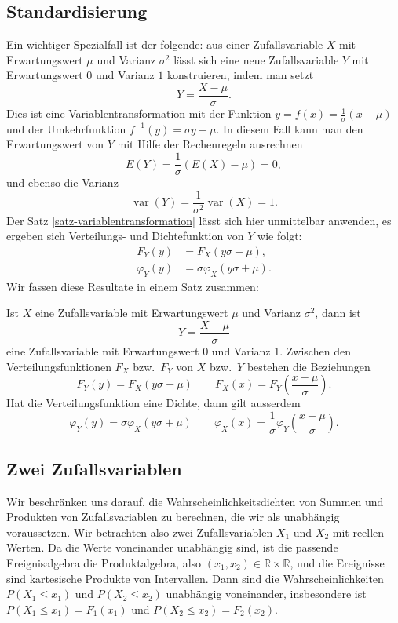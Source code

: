 \subsection{Standardisierung} \label{section-standardisierung}
Ein wichtiger Spezialfall ist der folgende:
aus einer Zufallsvariable $X$ mit Erwartungswert
$\mu$ und Varianz $\sigma^2$ lässt sich eine neue Zufallsvariable $Y$ mit
Erwartungswert $0$ und Varianz $1$ konstruieren, indem man setzt
\[
Y=\frac{X-\mu}{\sigma}.
\]
Dies ist eine Variablentransformation mit der Funktion
$y=f(x)=\frac1\sigma(x-\mu)$ und der Umkehrfunktion $f^{-1}(y)=\sigma y+\mu$.
In diesem Fall kann man den Erwartungswert von $Y$ mit Hilfe der Rechenregeln
ausrechnen
\[
E(Y)=\frac1{\sigma}(E(X)-\mu)=0,
\]
und ebenso die Varianz
\[
\operatorname{var}(Y)=\frac1{\sigma^2}\operatorname{var}(X)=1.
\]
Der Satz \ref{satz-variablentransformation} lässt sich hier unmittelbar
anwenden, es ergeben sich Verteilungs- und Dichtefunktion von $Y$
wie folgt:
\begin{align*}
F_Y(y)&=F_X(y\sigma+\mu),\\
\varphi_Y(y)&=\sigma\varphi_X(y\sigma+\mu).
\end{align*}
Wir fassen diese Resultate in einem Satz zusammen:

\begin{satz}
\label{satz-standardisierung}
Ist $X$ eine Zufallsvariable mit Erwartungswert $\mu$ und
Varianz $\sigma^2$, dann ist
\[
Y=\frac{X-\mu}\sigma
\]
eine Zufallsvariable mit Erwartungswert 0 und Varianz 1.
Zwischen den Verteilungsfunktionen $F_X$ bzw.~$F_Y$ von $X$ bzw.~$Y$ 
bestehen die Beziehungen
\[
F_Y(y)=F_X(y\sigma+\mu)\qquad F_X(x)=F_Y\left(\frac{x-\mu}\sigma\right).
\]
Hat die Verteilungsfunktion eine Dichte, dann gilt ausserdem
\[
\varphi_Y(y)=\sigma\varphi_X(y\sigma+\mu)\qquad
\varphi_X(x)=\frac1{\sigma}\varphi_Y\left(\frac{x-\mu}\sigma\right).
\]
\end{satz}


\subsection{Zwei Zufallsvariablen}
Wir beschränken uns darauf, die Wahrscheinlichkeitsdichten von Summen
und Produkten von Zufallsvariablen zu berechnen, die wir als unabhängig
voraussetzen.
Wir betrachten also zwei Zufallsvariablen $X_1$ und $X_2$ mit reellen
Werten.
Da die Werte voneinander unabhängig sind, ist
die passende Ereignisalgebra die Produktalgebra, also
$(x_1,x_2)\in
\mathbb{R}\times\mathbb{R}$,
und die Ereignisse sind kartesische Produkte von Intervallen.
Dann sind
die Wahrscheinlichkeiten $P(X_1\le x_1)$  und $P(X_2\le x_2)$ unabhängig
voneinander, insbesondere ist $P(X_1\le x_1)=F_1(x_1)$ und
$P(X_2\le x_2)=F_2(x_2)$.

